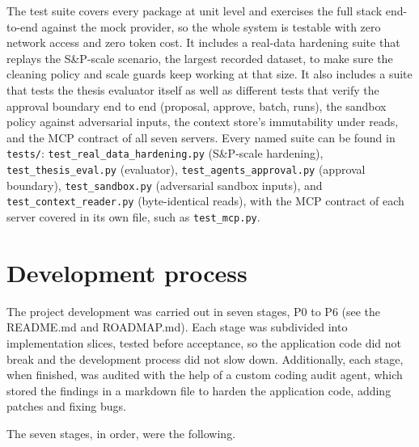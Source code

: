 The test suite covers every package at unit level and exercises the full stack end-to-end against the mock provider, so the whole system is testable
with zero network access and zero token cost. It includes a real-data hardening suite that replays the S\&P-scale scenario, the largest recorded
dataset, to make sure the cleaning policy and scale guards keep working at that size. It also includes a suite that tests the thesis evaluator itself as well as different tests that verify the approval boundary end to end (proposal, approve, batch, runs), the sandbox policy against adversarial inputs, the context store's immutability under reads, and the MCP contract of all seven servers. Every named suite can be found in \texttt{tests/}:
\texttt{test\_real\_data\_hardening.py} (S\&P-scale hardening), \texttt{test\_thesis\_eval.py} (evaluator), \texttt{test\_agents\_approval.py} (approval boundary), \texttt{test\_sandbox.py} (adversarial sandbox inputs), and \texttt{test\_context\_reader.py} (byte-identical reads), with the MCP contract of each server covered in its own file, such as \texttt{test\_mcp.py}.

\section{Development process}
\label{sec:process}

The project development was carried out in seven stages, P0 to P6 (see the README.md and ROADMAP.md). Each stage was subdivided into implementation
slices, tested before acceptance, so the application code did not break and the development process did not slow down. Additionally, each stage, when
finished, was audited with the help of a custom coding audit agent, which stored the findings in a markdown file to harden the application code,
adding patches and fixing bugs.

The seven stages, in order, were the following.

